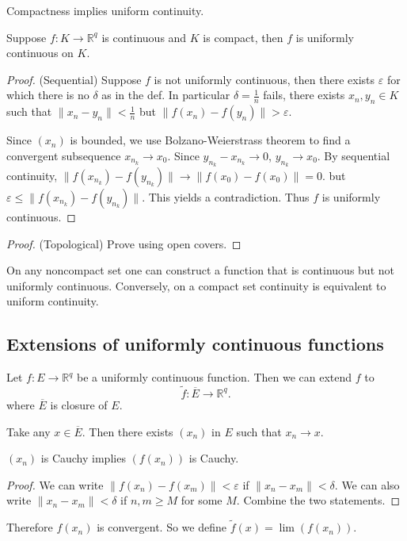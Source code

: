 Compactness implies uniform continuity.
\begin{theorem}
	Suppose $f: K \to \mathbb{R}^q$ is continuous and $K $ is compact, then $f$ is uniformly continuous on $K$.
\end{theorem}
\begin{proof}
	(Sequential) Suppose $f$ is not uniformly continuous, then there exists $\varepsilon$ for which there is no $\delta$ as in the def. In particular $\delta = \frac{1}{n}$ fails, there exists $x_n, y_n \in K$ such that $\|x_n - y_n\| < \frac{1}{n}$ but $\|f(x_n) - f(y_n)\| >\varepsilon$.

	Since $(x_n)$ is bounded, we use Bolzano-Weierstrass theorem to find a convergent subsequence $x_{n_k} \to  x_0$. Since $y_{n_k} - x_{n_k} \to 0 $, $y_{n_k}\to  x_0$. By sequential continuity, $\|f(x_{n_k})  - f(y_{n_k})\| \to\| f(x_0) - f(x_0)\| = 0$. but $\varepsilon \le \|f(x_{n_k}) - f(y_{n_k})\|$. This yields a contradiction. Thus $f$ is uniformly continuous.
\end{proof}
\begin{proof}
	(Topological) Prove using open covers.
\end{proof}
\begin{fact}
	On any noncompact set one can construct a function that is continuous but not uniformly continuous. Conversely, on a compact set continuity is equivalent to uniform continuity.
\end{fact}

\subsection{Extensions of uniformly continuous functions}

Let $f: E \to  \mathbb{R}^q$ be a uniformly continuous function. Then we can extend $f$ to \[
	\tilde f : \overline{E} \to \mathbb{R}^q
.\] 
where $\overline{E} $ is closure of $E$.

Take any $x \in \overline{E} $. Then there exists $(x_n)$ in $E$ such that $x_n \to x$.

\begin{claim}
	$(x_n)$ is Cauchy implies $\left( f(x_n) \right) $ is Cauchy.
\end{claim}
\begin{proof}
	We can write $\|f(x_n) - f(x_m)\|< \varepsilon$ if $\|x_n - x_m\|< \delta$. We can also write $\|x_n - x_m\|< \delta$ if $n, m \ge M$ for some $M$. Combine the two statements.
\end{proof}
Therefore $f(x_n)$ is convergent. So we define $\tilde f (x) = \lim \left( f(x_n) \right) $.

